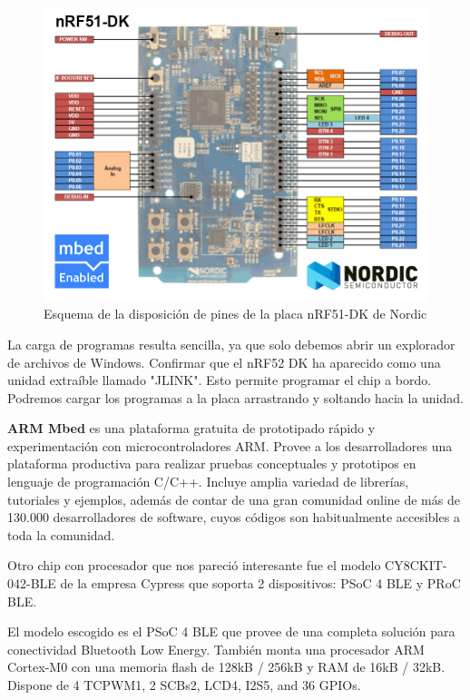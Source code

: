 \begin{figure}[h]%
	\centering
    \includegraphics[scale=0.5]{figures/nRF51DK_pines.png} %

    \caption[Esquema de la disposición de pines de la placa nRF51-DK de Nordic]{Esquema de la disposición de pines de la placa nRF51-DK de Nordic}

   \label{figuraNordicNRF51}
\end{figure}

La  carga de programas resulta sencilla, ya que solo debemos abrir un explorador de archivos de Windows. Confirmar que el nRF52 DK ha aparecido como una unidad extraíble llamado "JLINK". Esto permite programar el chip a bordo. Podremos cargar los programas a la placa arrastrando y soltando hacia la unidad.

\textbf{ARM Mbed} es una plataforma gratuita de prototipado rápido y experimentación con microcontroladores ARM. Provee a los desarrolladores una plataforma productiva para realizar pruebas conceptuales y prototipos en lenguaje de programación C/C++. Incluye amplia variedad de librerías, tutoriales y ejemplos, además de contar de una gran comunidad online de más de 130.000 desarrolladores de software, cuyos códigos son habitualmente accesibles a toda la comunidad.

Otro chip con procesador que nos pareció interesante fue el modelo CY8CKIT-042-BLE de la empresa Cypress que soporta 2 dispositivos: PSoC 4 BLE y  PRoC BLE.

El modelo escogido es el PSoC 4 BLE que provee de una completa solución para conectividad Bluetooth Low Energy. También monta una procesador ARM Cortex-M0 con una memoria flash de 128kB / 256kB y RAM de 16kB / 32kB. Dispone de 4 TCPWM1, 2 SCBs2, LCD4, I2S5, and 36 GPIOs.

